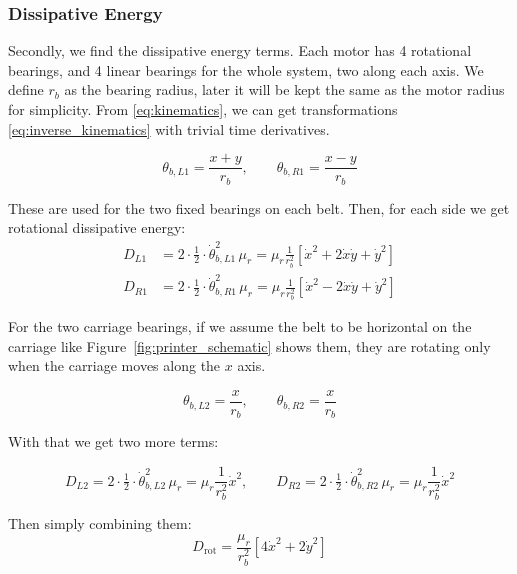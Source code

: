 \subsubsection*{Dissipative Energy}
Secondly, we find the dissipative energy terms. Each motor has 4 rotational bearings, and 4 linear bearings for the whole system, two along each axis. We define $r_b$ as the bearing radius, later it will be kept the same as the motor radius for simplicity. From \eqref{eq:kinematics}, we can get transformations \eqref{eq:inverse_kinematics} with trivial time derivatives.  

\begin{equation}
\label{eq:inverse_kinematics}
\theta_{b,L1} = \frac{ x +  y}{r_b},
\qquad
\theta_{b,R1} = \frac{ x - y}{r_b}
\end{equation}

These are used for the two fixed bearings on each belt. Then, for each side we get rotational dissipative energy:
\begin{equation*}
\begin{aligned}
D_{L1} &= 2\cdot \tfrac{1}{2}\cdot \dot\theta_{b,L1}^2\,\mu_r 
    = \mu_r \frac{1}{r_b^2}\left[\dot x^2 + 2\dot x\dot y + \dot y^2\right] \\
D_{R1} &= 2\cdot \tfrac{1}{2}\cdot \dot\theta_{b,R1}^2\,\mu_r 
    = \mu_r \frac{1}{r_b^2}\left[\dot x^2 - 2\dot x\dot y + \dot y^2\right]
\end{aligned}
\end{equation*}

For the two carriage bearings, if we assume the belt to be horizontal on the carriage like Figure~\ref{fig:printer_schematic} shows them, they are rotating only when the carriage moves along the $x$ axis.

\begin{equation}
\label{eq:carriage_kinematics}
\theta_{b,L2} = \frac{ x }{r_b},
\qquad
\theta_{b,R2} = \frac{ x }{r_b}
\end{equation}

With that we get two more terms:

\begin{equation*}
D_{L2} = 2\cdot \tfrac{1}{2}\cdot \dot\theta_{b,L2}^2\,\mu_r 
    = \mu_r \frac{1}{r_b^2}\dot x^2, \qquad
D_{R2} = 2\cdot \tfrac{1}{2}\cdot \dot\theta_{b,R2}^2\,\mu_r 
    = \mu_r \frac{1}{r_b^2}\dot x^2
\end{equation*}

Then simply combining them:
\begin{equation*}
\boxed{D_{\mathrm{rot}} = \frac{\mu_r}{r_b^2}\left[4\dot x^2 + 2\dot y^2\right]}
\end{equation*}


